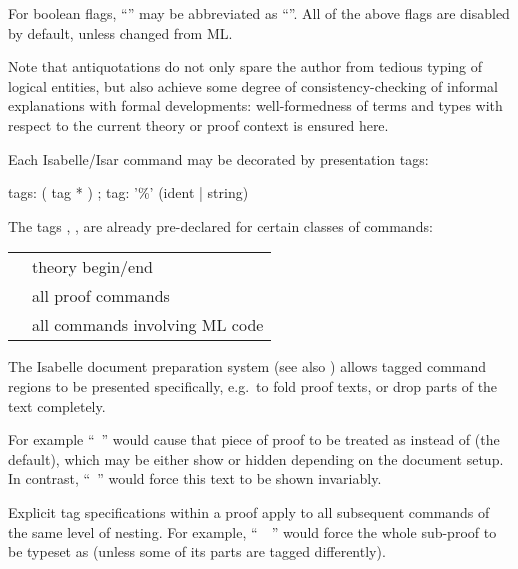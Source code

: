 \begin{isabellebody}
\begin{isamarkuptext}
  For boolean flags, ``'' may be abbreviated as
  ``''.  All of the above flags are disabled by default,
  unless changed from ML.

  \medskip Note that antiquotations do not only spare the author from
  tedious typing of logical entities, but also achieve some degree of
  consistency-checking of informal explanations with formal
  developments: well-formedness of terms and types with respect to the
  current theory or proof context is ensured here.%
\end{isamarkuptext}%
\isamarkuptrue%
%
\isamarkuptrue%
%
\begin{isamarkuptext}%
Each Isabelle/Isar command may be decorated by presentation tags:

  \begin{rail}
    tags: ( tag * )
    ;
    tag: '\%' (ident | string)
  \end{rail}

  The tags , ,  are already
  pre-declared for certain classes of commands:

 \medskip

  \begin{tabular}{ll}
    \isa{theory} & theory begin/end \\
    \isa{proof} & all proof commands \\
    \isa{ML} & all commands involving ML code \\
  \end{tabular}

  \medskip The Isabelle document preparation system (see also
  \cite{isabelle-sys}) allows tagged command regions to be presented
  specifically, e.g.\ to fold proof texts, or drop parts of the text
  completely.

  For example ``~'' would
  cause that piece of proof to be treated as  instead
  of  (the default), which may be either show or hidden
  depending on the document setup.  In contrast, ``~'' would force this text to be shown
  invariably.

  Explicit tag specifications within a proof apply to all subsequent
  commands of the same level of nesting.  For example, ``~~'' would force the
  whole sub-proof to be typeset as  (unless some of its
  parts are tagged differently).%
\end{isamarkuptext}%
\isamarkuptrue%
%
\isadelimtheory
%
\endisadelimtheory
%
\isatagtheory
{}\isamarkupfalse%
%
\endisatagtheory
{\isafoldtheory}%
%
\isadelimtheory
%
\endisadelimtheory
\isanewline
\end{isabellebody}%
